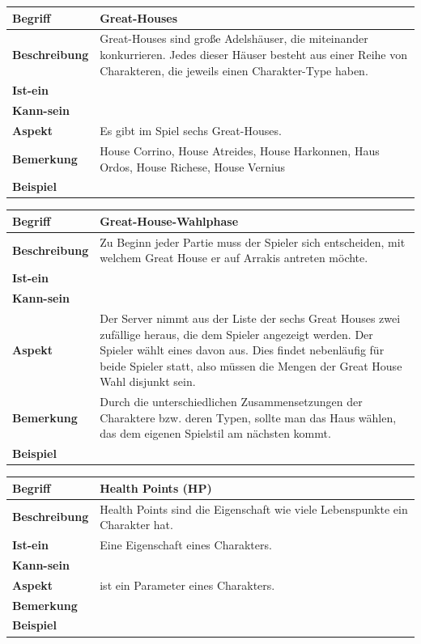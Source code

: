 \documentclass[12pt]{article}
\begin{document}
\begin{tabularx}{\linewidth}{|l|X|}
\hline
\textbf{Begriff} & \textbf{Great-Houses} \\
\hline
\textbf{Beschreibung} & Great-Houses sind große Adelshäuser, die miteinander konkurrieren. Jedes dieser Häuser besteht aus einer Reihe von Charakteren, die jeweils einen Charakter-Type haben. \\
\hline
\textbf{Ist-ein} & \\
\hline
\textbf{Kann-sein} & \\
\hline
\textbf{Aspekt} & Es gibt im Spiel sechs Great-Houses.\\
\hline
\textbf{Bemerkung} & House Corrino, House Atreides, House Harkonnen, Haus Ordos, House Richese, House Vernius \\
\hline
\textbf{Beispiel} &  \\
\hline
\end{tabularx}

\begin{tabularx}{\linewidth}{|l|X|}
\hline
\textbf{Begriff} & \textbf{Great-House-Wahlphase} \\
\hline
\textbf{Beschreibung} & Zu Beginn jeder Partie muss der Spieler sich entscheiden, mit welchem Great House er auf Arrakis antreten möchte. \\
\hline
\textbf{Ist-ein} & \\
\hline
\textbf{Kann-sein} & \\
\hline
\textbf{Aspekt} & Der Server nimmt aus der Liste der sechs Great Houses zwei zufällige heraus, die dem Spieler angezeigt werden. Der Spieler wählt eines davon aus. Dies findet nebenläufig für beide Spieler statt, also müssen die Mengen der Great House Wahl disjunkt sein.\\
\hline
\textbf{Bemerkung} & Durch die unterschiedlichen Zusammensetzungen der Charaktere bzw. deren Typen, sollte man das Haus wählen, das dem eigenen Spielstil am nächsten kommt. \\
\hline
\textbf{Beispiel} &  \\
\hline
\end{tabularx}


\begin{tabularx}{\linewidth}{|l|X|}
\hline
\textbf{Begriff} & \textbf{Health Points (HP)} \\
\hline
\textbf{Beschreibung} & Health Points sind die Eigenschaft wie viele Lebenspunkte ein Charakter hat.\\
\hline
\textbf{Ist-ein} & Eine Eigenschaft eines Charakters.\\
\hline
\textbf{Kann-sein} & \\
\hline
\textbf{Aspekt} & ist ein Parameter eines Charakters. \\
\hline
\textbf{Bemerkung} & \\
\hline
\textbf{Beispiel} &  \\
\hline
\end{tabularx}
\end{document}
